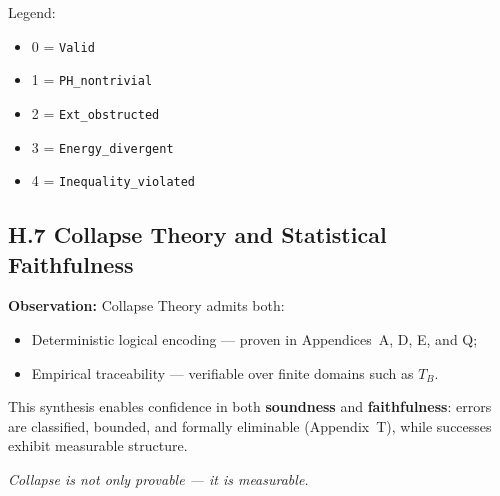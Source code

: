 \documentclass[11pt]{article}
\begin{document}
\begin{center}
\end{center}

\vspace{0.5em}
\noindent
Legend:
\begin{itemize}
  \item 0 = \texttt{Valid}
  \item 1 = \texttt{PH\_nontrivial}
  \item 2 = \texttt{Ext\_obstructed}
  \item 3 = \texttt{Energy\_divergent}
  \item 4 = \texttt{Inequality\_violated}
\end{itemize}

\subsection*{H.7 Collapse Theory and Statistical Faithfulness}

\textbf{Observation:} Collapse Theory admits both:
\begin{itemize}
  \item Deterministic logical encoding — proven in Appendices~A, D, E, and Q;
  \item Empirical traceability — verifiable over finite domains such as \( T_B \).
\end{itemize}

This synthesis enables confidence in both \textbf{soundness} and \textbf{faithfulness}:  
errors are classified, bounded, and formally eliminable (Appendix~T), while successes  
exhibit measurable structure.

\begin{center}
\textit{Collapse is not only provable — it is measurable.}
\end{center}
\end{document}
